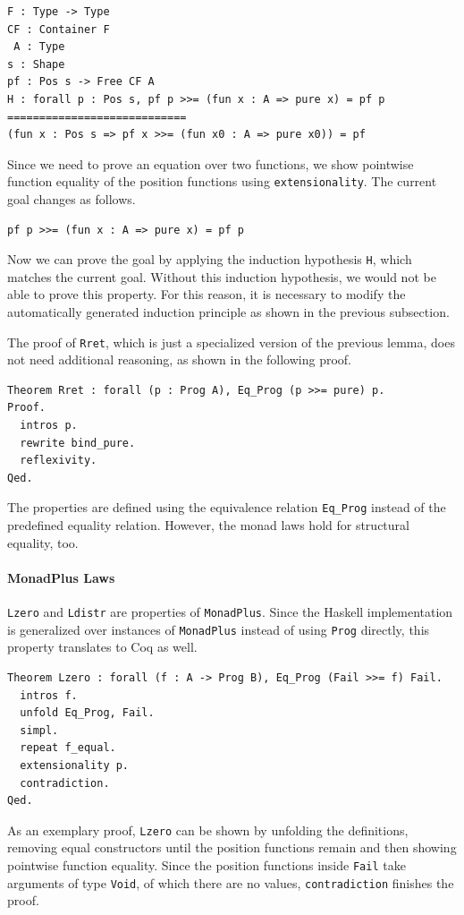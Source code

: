 \documentclass[a4paper, 11pt, fleqn, twoside, abstract=on]{scrreprt}
\newcommand{\hinl}[1]{\texttt{#1}}
\newcommand{\cinl}[1]{\texttt{#1}}
\begin{document}
\begin{verbatim}
F : Type -> Type
CF : Container F
 A : Type
s : Shape
pf : Pos s -> Free CF A
H : forall p : Pos s, pf p >>= (fun x : A => pure x) = pf p
============================
(fun x : Pos s => pf x >>= (fun x0 : A => pure x0)) = pf
\end{verbatim}
\noindent
Since we need to prove an equation over two functions, we show pointwise function equality of the position functions using \cinl{extensionality}.
The current goal changes as follows.

\begin{verbatim}
pf p >>= (fun x : A => pure x) = pf p
\end{verbatim}

Now we can prove the goal by applying the induction hypothesis \cinl{H}, which matches the current goal.
Without this induction hypothesis, we would not be able to prove this property.
For this reason, it is necessary to modify the automatically generated induction principle as shown in the previous subsection.

The proof of \cinl{Rret}, which is just a specialized version of the previous lemma, does not need additional reasoning, as shown in the following proof.

\begin{verbatim}
Theorem Rret : forall (p : Prog A), Eq_Prog (p >>= pure) p.
Proof.
  intros p.
  rewrite bind_pure.
  reflexivity.
Qed.
\end{verbatim}
\noindent
The properties are defined using the equivalence relation \cinl{Eq_Prog} instead of the predefined equality relation.
However, the monad laws hold for structural equality, too.

\paragraph{MonadPlus Laws}
\cinl{Lzero} and \cinl{Ldistr} are properties of \hinl{MonadPlus}.
Since the Haskell implementation is generalized over instances of \cinl{MonadPlus} instead of using \cinl{Prog} directly, this property translates to Coq as well.

\begin{verbatim}
Theorem Lzero : forall (f : A -> Prog B), Eq_Prog (Fail >>= f) Fail.
  intros f.
  unfold Eq_Prog, Fail.
  simpl.
  repeat f_equal.
  extensionality p.
  contradiction.
Qed.
\end{verbatim}

As an exemplary proof, \cinl{Lzero} can be shown by unfolding the definitions, removing equal constructors until the position functions remain and then showing pointwise function equality.
Since the position functions inside \cinl{Fail} take arguments of type \cinl{Void}, of which there are no values, \cinl{contradiction} finishes the proof.
\end{document}
